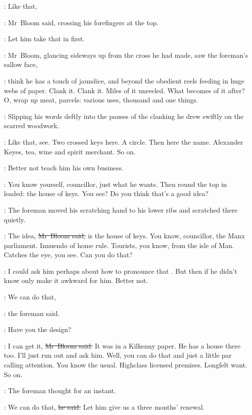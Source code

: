 \Bloom:
Like that,

:
Mr~Bloom said,
crossing his forefingers at the top.

\BloomInt:
Let him take that in first.

:
Mr~Bloom,
glancing sideways up from the cross he had made,
saw the foreman's sallow face,

\BloomInt:
think he has a touch of jaundice,
and beyond
the obedient reels feeding in huge webs of paper.
Clank it.
Clank it.
Miles of it unreeled.
What becomes of it after?
O, wrap up meat, parcels:
various uses,
thousand and one things.

:
Slipping his words deftly into the pauses of the clanking
he drew swiftly on the scarred woodwork.



\Bloom:
Like that, see.
Two crossed keys here.
A circle.
Then here the name.
Alexander Keyes,
tea, wine and spirit merchant.
So on.

\BloomInt:
Better not teach him his own business.

\Bloom:
You know yourself, councillor,
just what he wants.
Then round the top in leaded:
the house of keys.
You see?
Do you think that's a good idea?

:
The foreman moved his scratching hand to his lower ribs
and scratched there quietly.

\Bloom:
The idea,
\sout{Mr~Bloom said,}
is the house of keys.
You know, councillor,
the Manx parliament.
Innuendo of home rule.
Tourists, you know, from the isle of Man.
Catches the eye, you see.
Can you do that?

\BloomInt:
I could ask him perhaps about how to pronounce that .
But then if he didn't know
only make it awkward for him.
Better not.

\foreman:
We can do that,

:
the foreman said.

\foreman:
Have you the design?

\Bloom:
I can get it,
\sout{Mr~Bloom said.}
It was in a Kilkenny paper.
He has a house there too.
I'll just run out and ask him.
Well, you can do that and just a little par calling attention.
You know the usual.
Highclass licensed premises.
Longfelt want.
So on.

:
The foreman thought for an instant.

\foreman:
We can do that,
\sout{he said.}
Let him give us a three months' renewal.

